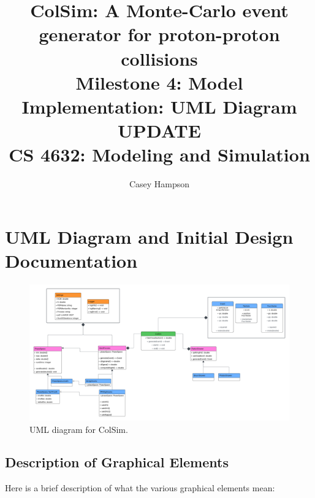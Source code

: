 \documentclass[titlepage]{article}
\title{ColSim: A Monte-Carlo event generator for proton-proton collisions \\[8pt] Milestone 4: Model Implementation: UML Diagram UPDATE \\[5pt] CS 4632: Modeling and Simulation}
\author{Casey Hampson}
\begin{document}
\maketitle
\pagebreak

\section*{UML Diagram and Initial Design Documentation}

\begin{figure}[ht]
  \centering
  \includegraphics[width=0.9\linewidth]{./res/ColSim.png}
  \caption{UML diagram for ColSim.}
  \label{fig:uml}
\end{figure}

\subsection*{Description of Graphical Elements}

Here is a brief description of what the various graphical elements mean:
\end{document}
